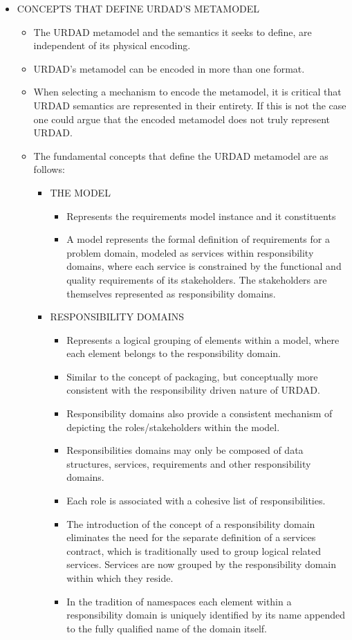 \begin{itemize}
	\item CONCEPTS THAT DEFINE URDAD'S METAMODEL
		\begin{itemize}
			\item The URDAD metamodel and the semantics it seeks to define, are independent of its physical encoding.
			\item URDAD's metamodel can be encoded in more than one format.
			\item When selecting a mechanism to encode the metamodel, it is critical that URDAD semantics are represented in their entirety. If this is not the case one could argue that the encoded metamodel does not truly represent URDAD.
			\item The fundamental concepts that define the URDAD metamodel are as follows:
			\begin{itemize}

				\item THE MODEL
					\begin{itemize}
						\item Represents the requirements model instance and it constituents
						\item A model represents the formal definition of requirements for a problem domain, modeled as services within responsibility domains, where each service is constrained by the functional and quality requirements of its stakeholders. The stakeholders are themselves represented as responsibility domains.
					\end{itemize}
					
				\item RESPONSIBILITY DOMAINS
					\begin{itemize}
						\item Represents a logical grouping of elements within a model, where each element belongs to the responsibility domain.
						\item Similar to the concept of packaging, but conceptually more consistent with the responsibility driven nature of URDAD.
						\item Responsibility domains also provide a consistent mechanism of depicting the roles/stakeholders within the model.
						\item Responsibilities domains may only be composed of data structures, services, requirements and other responsibility domains.
						\item Each role is associated with a cohesive list of responsibilities.
						\item The introduction of the concept of a responsibility domain eliminates the need for the separate definition of a services contract, which is traditionally used to group logical related services. Services are now grouped by the responsibility domain within which they reside.
						\item In the tradition of namespaces each element within a responsibility domain is uniquely identified by its name appended to the fully qualified name of the domain itself.
					\end{itemize}
					

\end{itemize}
\end{itemize}
\end{itemize}
